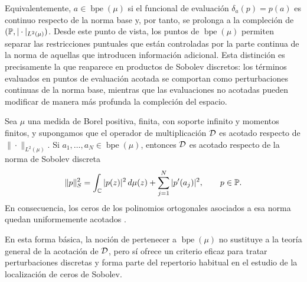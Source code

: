 Equivalentemente, \(a\in\operatorname{bpe}(\mu)\) si el funcional de evaluación
\(\delta_a(p)=p(a)\) es continuo respecto de la norma base y, por tanto, se
prolonga a la compleción de \((\mathbb{P},|\cdot|_{L^2(\mu)})\). Desde este
punto de vista, los puntos de \(\operatorname{bpe}(\mu)\) permiten separar las
restricciones puntuales que están controladas por la parte continua de la norma
de aquellas que introducen información adicional. Esta distinción es precisamente la que reaparece en productos de Sobolev discretos: los términos evaluados en puntos de evaluación acotada se comportan como perturbaciones continuas de la norma base, mientras que las evaluaciones no acotadas pueden modificar de manera más profunda la compleción del espacio.


\begin{prop}
	\label{prop:bpe_sobolev_discreto}
	Sea \(\mu\) una medida de Borel positiva, finita, con soporte infinito y momentos finitos, y
	supongamos que el operador de multiplicación \(\mathcal{D}\) es acotado respecto de
	\(\|\cdot\|_{L^2(\mu)}\). Si \(a_1,\dots,a_N\in \operatorname{bpe}(\mu)\),
	entonces \(\mathcal{D}\) es acotado respecto de la norma de Sobolev discreta
	\[
		\|p\|_S^2
		=
		\int_{\mathbb{C}}|p(z)|^2\,d\mu(z)
		+
		\sum_{j=1}^N |p'(a_j)|^2,
		\qquad p\in\mathbb{P}.
	\]
	En consecuencia, los ceros de los polinomios ortogonales asociados a esa norma
	quedan uniformemente acotados \cite{EG25-2}.
\end{prop}

En esta forma básica, la noción de pertenecer a
\(\operatorname{bpe}(\mu)\) no sustituye a la teoría general de la acotación de
\(\mathcal{D}\), pero sí ofrece un criterio eficaz para tratar perturbaciones discretas y
forma parte del repertorio habitual en el estudio de la localización de ceros de
Sobolev.
